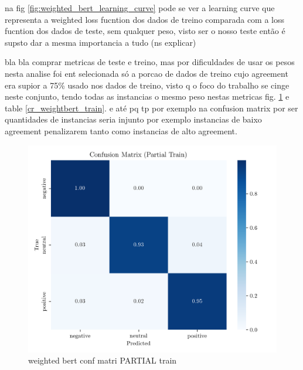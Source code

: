 \documentclass[conference]{IEEEtran}
\begin{document}
na fig \ref{fig:weighted_bert_learning_curve} pode se ver a learning curve que representa a weighted loss fucntion dos dados de treino comparada com a loss fucntion dos dados de teste, sem qualquer peso, visto ser o nosso teste então é supsto dar a mesma importancia a tudo (ns explicar)

bla bla comprar metricas de teste e treino, mas por dificuldades de usar os pesos nesta analise foi ent selecionada só a porcao de dados de treino cujo agreement era supior a 75\% usado nos dados de treino, visto q o foco do trabalho se cinge neste conjunto, tendo todas as instancias o mesmo peso nestas metricas fig. \ref{fig:weighted_bert_confusion_matrix_Partial} e table \ref{cr_weightbert_train}. e até pq tp por exemplo na confusion matrix por ser quantidades de instancias seria injunto por exemplo instancias de baixo agreement penalizarem tanto como instancias de alto agreement.

\begin{figure}[H]
    \centering
    \includegraphics[width=1\linewidth]{assets/weighted_bert_confusion_matrix_Partial Train.png}
    \caption{weighted bert conf matri PARTIAL train}
    \label{fig:weighted_bert_confusion_matrix_Partial}
\end{figure}
\end{document}
